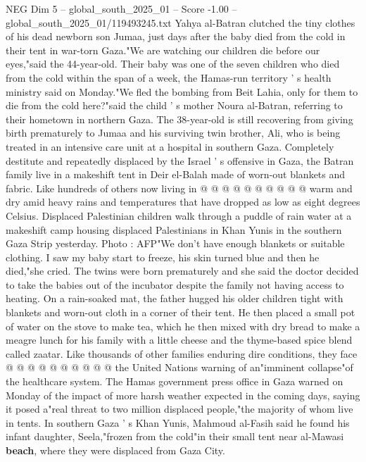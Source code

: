 \begin{textsample}{NEG Dim 5 – global\_south\_2025\_01 – Score -1.00 – global\_south\_2025\_01/119493245.txt}  \label{ex:f5_neg_108}
Yahya al-Batran clutched the tiny clothes of his dead newborn son Jumaa, just days after the baby died from the cold in their tent in war-torn Gaza."We are watching our children die before our eyes,"said the 44-year-old.
Their baby was one of the seven children who died from the cold within the span of a week, the Hamas-run territory ' s health ministry said on Monday."We fled the bombing from Beit Lahia, only for them to die from the cold here?"said the child ' s mother Noura al-Batran, referring to their hometown in northern Gaza.
The 38-year-old is still recovering from giving birth prematurely to Jumaa and his surviving twin brother, Ali, who is being treated in an intensive care unit at a hospital in southern Gaza.
Completely destitute and repeatedly displaced by the Israel ' s offensive in Gaza, the Batran family live in a makeshift tent in Deir el-Balah made of worn-out blankets and fabric.
Like hundreds of others now living in @ @ @ @ @ @ @ @ @ @ warm and dry amid heavy rains and temperatures that have dropped as low as eight degrees Celsius.
Displaced Palestinian children walk through a puddle of rain water at a makeshift camp housing displaced Palestinians in Khan Yunis in the southern Gaza Strip yesterday.
Photo : AFP"We don't have enough blankets or suitable clothing.
I saw my baby start to freeze, his skin turned blue and then he died,"she cried.
The twins were born prematurely and she said the doctor decided to take the babies out of the incubator despite the family not having access to heating.
On a rain-soaked mat, the father hugged his older children tight with blankets and worn-out cloth in a corner of their tent.
He then placed a small pot of water on the stove to make tea, which he then mixed with dry bread to make a meagre lunch for his family with a little cheese and the thyme-based spice blend called zaatar.
Like thousands of other families enduring dire conditions, they face @ @ @ @ @ @ @ @ @ @ the United Nations warning of an"imminent collapse"of the healthcare system.
The Hamas government press office in Gaza warned on Monday of the impact of more harsh weather expected in the coming days, saying it posed a"real threat to two million displaced people,"the majority of whom live in tents.
In southern Gaza ' s Khan Yunis, Mahmoud al-Fasih said he found his infant daughter, Seela,"frozen from the cold"in their small tent near al-Mawasi \textbf{beach}, where they were displaced from Gaza City.

\end{textsample}

